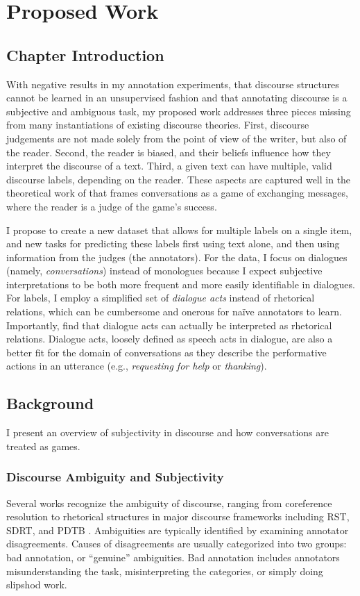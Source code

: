 \chapter{Proposed Work}
\label{ch:proposed}


\section{Chapter Introduction}
With negative results in my annotation experiments, that discourse structures cannot be learned in an unsupervised fashion and that annotating discourse is a subjective and ambiguous task, my proposed work addresses three pieces missing from many instantiations of existing discourse theories. First, discourse judgements are not made solely from the point of view of the writer, but also of the reader. Second, the reader is biased, and their beliefs influence how they interpret the discourse of a text. Third, a given text can have multiple, valid discourse labels, depending on the reader. These aspects are captured well in the theoretical work of \citet{Asher:2018} that frames conversations as a game of exchanging messages, where the reader is a judge of the game's success. 

I propose to create a new dataset that allows for multiple labels on a single item, and new tasks for predicting these labels first using text alone, and then using information from the judges (the annotators). For the data, I focus on dialogues (namely, \emph{conversations}) instead of monologues because I expect subjective interpretations to be both more frequent and more easily identifiable in dialogues. For labels, I employ a simplified set of \emph{dialogue acts} instead of rhetorical relations, which can be cumbersome and onerous for na\"ive annotators to learn. Importantly, \citet{Asher:2001} find that dialogue acts can actually be interpreted as rhetorical relations. Dialogue acts, loosely defined as speech acts in dialogue, are also a better fit for the domain of conversations as they describe the performative actions in an utterance (e.g., \emph{requesting for help} or \emph{thanking}).  

\section{Background}
I present an overview of subjectivity in discourse and how conversations are treated as games.

\subsection{Discourse Ambiguity and Subjectivity} Several works recognize the ambiguity of discourse, ranging from coreference resolution to rhetorical structures in major discourse frameworks including RST, SDRT, and PDTB \citep{Poesio:2019,Das:2017,Asher:2003,Versley:2011}. Ambiguities are typically identified by examining annotator disagreements.
Causes of disagreements are usually categorized into two groups: bad annotation, or ``genuine'' ambiguities. Bad annotation includes annotators misunderstanding the task, misinterpreting the categories, or simply doing slipshod work. 

